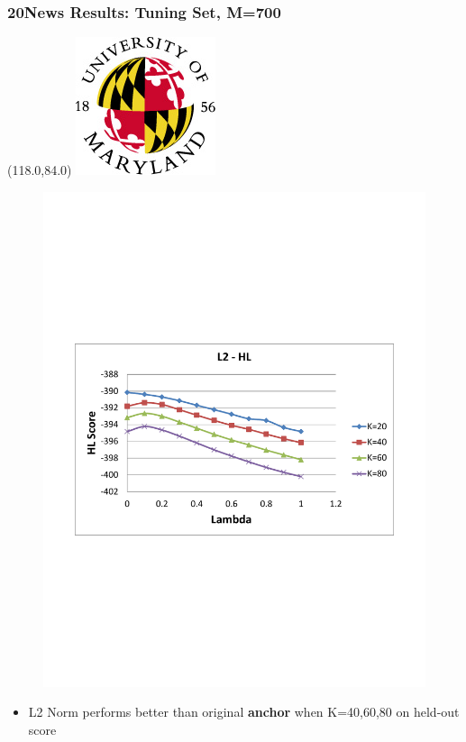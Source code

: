 \documentclass{beamer}
\let\oldframetitle\frametitle
\renewcommand{\frametitle}[1]{
\oldframetitle{#1}
\BottomLogo
}
\newcommand{\BottomLogo}{
\begin{textblock}{14}(118.0,84.0)
\includegraphics[height=.8cm]{figures/umd-logo1.jpg}
\end{textblock}
}
\begin{document}
\begin{frame}

\frametitle{20News Results: Tuning Set, M=700}

\begin{figure}
\includegraphics[width=0.7\linewidth]{figures/20news_700_Likelihood.pdf}
\end{figure}
\vspace{-0.1in}
\begin{itemize}
\item L2 Norm performs better than original {\bf anchor} when K=40,60,80 on held-out score
\end{itemize}
\end{frame}
\end{document}
